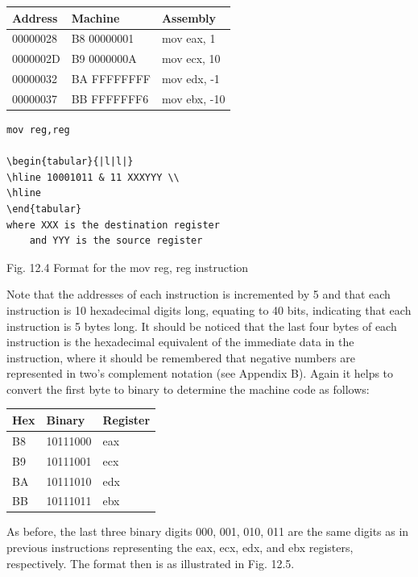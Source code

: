 \documentclass[10pt]{article}
\begin{document}
\begin{center}
\begin{tabular}{|l|l|l|}
\hline
Address & Machine & Assembly \\
\hline
00000028 & B8 00000001 & mov eax, 1 \\
\hline
0000002D & B9 0000000A & mov ecx, 10 \\
\hline
00000032 & BA FFFFFFFF & mov edx, -1 \\
\hline
00000037 & BB FFFFFFF6 & mov ebx, -10 \\
\hline
\end{tabular}
\end{center}

\begin{verbatim}
mov reg,reg

\begin{tabular}{|l|l|}
\hline 10001011 & 11 XXXYYY \\
\hline
\end{tabular}
where XXX is the destination register
    and YYY is the source register
\end{verbatim}

Fig. 12.4 Format for the mov reg, reg instruction

Note that the addresses of each instruction is incremented by 5 and that each instruction is 10 hexadecimal digits long, equating to 40 bits, indicating that each instruction is 5 bytes long. It should be noticed that the last four bytes of each instruction is the hexadecimal equivalent of the immediate data in the instruction, where it should be remembered that negative numbers are represented in two's complement notation (see Appendix B). Again it helps to convert the first byte to binary to determine the machine code as follows:

\begin{center}
\begin{tabular}{|l|l|l|}
\hline
Hex & Binary & Register \\
\hline
B8 & 10111000 & eax \\
\hline
B9 & 10111001 & ecx \\
\hline
BA & 10111010 & edx \\
\hline
BB & 10111011 & ebx \\
\hline
\end{tabular}
\end{center}

As before, the last three binary digits 000, 001, 010, 011 are the same digits as in previous instructions representing the eax, ecx, edx, and ebx registers, respectively. The format then is as illustrated in Fig. 12.5.
\end{document}
